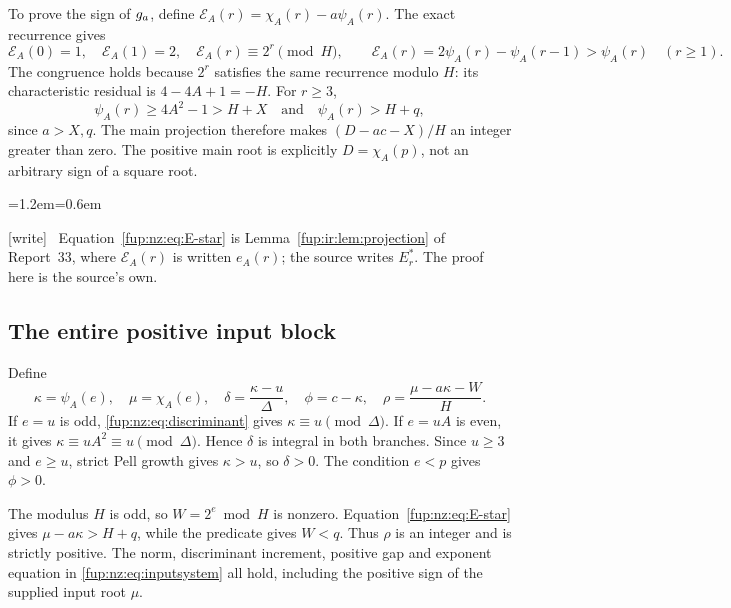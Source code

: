 \documentclass[11pt,letterpaper]{article}
\theoremstyle{definition}\newtheorem{definition}[theorem]{Definition}
\theoremstyle{remark}\newtheorem{remark}[theorem]{Remark}
\newcommand{\ea}{e_A}
\newcommand{\wtag}{\textup{[write]}}
\newenvironment{writenote}{\par\smallskip\begin{list}{}{\leftmargin=1.2em\rightmargin=0.6em}\item[]\small\wtag\ }{\end{list}\smallskip}
\begin{document}
To prove the sign of $g_a$, define $\mathcal E_A(r)=\chi_A(r)-a\psi_A(r)$. The exact recurrence gives
\begin{equation}\label{fup:nz:eq:E-star}
 \mathcal E_A(0)=1,\quad \mathcal E_A(1)=2,\quad \mathcal E_A(r)\equiv2^r\pmod H,\qquad
 \mathcal E_A(r)=2\psi_A(r)-\psi_A(r-1)>\psi_A(r)\quad(r\ge1).
\end{equation}
The congruence holds because $2^r$ satisfies the same recurrence modulo $H$: its characteristic residual is $4-4A+1=-H$. For $r\ge3$,
\[
 \psi_A(r)\ge4A^2-1>H+X\quad\text{and}\quad \psi_A(r)>H+q,
\]
since $a>X,q$. The main projection therefore makes $(D-ac-X)/H$ an integer greater than zero. The positive main root is explicitly $D=\chi_A(p)$, not an arbitrary sign of a square root.
\begin{writenote}
Equation~\eqref{fup:nz:eq:E-star} is Lemma~\ref{fup:ir:lem:projection} of Report~33, where $\mathcal E_A(r)$ is written $\ea(r)$; the source writes $E^*_r$. The proof here is the source's own.
\end{writenote}

\subsection{The entire positive input block}
Define
\begin{equation}\label{fup:nz:eq:inputwitness}
 \kappa=\psi_A(e),\quad\mu=\chi_A(e),\quad
 \delta=\frac{\kappa-u}{\Delta},\quad
 \phi=c-\kappa,\quad
 \rho=\frac{\mu-a\kappa-W}{H}.
\end{equation}
If $e=u$ is odd, \eqref{fup:nz:eq:discriminant} gives $\kappa\equiv u\pmod\Delta$. If $e=uA$ is even, it gives $\kappa\equiv uA^2\equiv u\pmod\Delta$. Hence $\delta$ is integral in both branches. Since $u\ge3$ and $e\ge u$, strict Pell growth gives $\kappa>u$, so $\delta>0$. The condition $e<p$ gives $\phi>0$.

The modulus $H$ is odd, so $W=2^e\bmod H$ is nonzero. Equation~\eqref{fup:nz:eq:E-star} gives $\mu-a\kappa>H+q$, while the predicate gives $W<q$. Thus $\rho$ is an integer and is strictly positive. The norm, discriminant increment, positive gap and exponent equation in \eqref{fup:nz:eq:inputsystem} all hold, including the positive sign of the supplied input root $\mu$.
\end{document}

